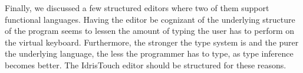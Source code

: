 Finally, we discussed a few structured editors where two of them support functional languages. Having the editor be cognizant of the underlying structure of the program seems to lessen the amount of typing the user has to perform on the virtual keyboard. Furthermore, the stronger the type system is and the purer the underlying language, the less the programmer has to type, as type inference becomes better. The IdrisTouch editor should be structured for these reasons.















